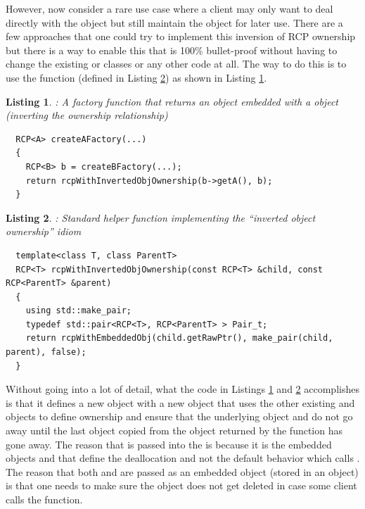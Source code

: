 \documentclass[pdf,ps2pdf,11pt]{SANDreport}
\newtheorem{listing}{Listing}
\begin{document}
However, now consider a rare use case where a client may only want to
deal directly with the {} object but still maintain the
{} object for later use.  There are a few approaches that
one could try to implement this inversion of RCP ownership but there
is a way to enable this that is 100\% bullet-proof without having to
change the existing {} or {} classes or any other
code at all.  The way to do this is to use the
{} function (defined in
Listing {}\ref{listing:rcpWithInvertedObjOwnership}) as shown in
Listing {}\ref{listing:A_owns_B_owns_A}.

\begin{listing}: A factory function that returns an {} object
embedded with a {} object (inverting the ownership relationship) \\
\label{listing:A_owns_B_owns_A}
{\small\begin{verbatim}
  RCP<A> createAFactory(...)
  {
    RCP<B> b = createBFactory(...);
    return rcpWithInvertedObjOwnership(b->getA(), b);
  }
\end{verbatim}}
\end{listing}


\begin{listing}: Standard helper function implementing the ``inverted
object ownership'' idiom \\
\label{listing:rcpWithInvertedObjOwnership}
{\small\begin{verbatim}
  template<class T, class ParentT>
  RCP<T> rcpWithInvertedObjOwnership(const RCP<T> &child, const RCP<ParentT> &parent)
  {
    using std::make_pair;
    typedef std::pair<RCP<T>, RCP<ParentT> > Pair_t;
    return rcpWithEmbeddedObj(child.getRawPtr(), make_pair(child, parent), false);
  }
\end{verbatim}}
\end{listing}




Without going into a lot of detail, what the code in Listings
{}\ref{listing:A_owns_B_owns_A} and
{}\ref{listing:rcpWithInvertedObjOwnership} accomplishes is that it
defines a new {} object with a new {} object
that uses the other existing {} and {} objects
to define ownership and ensure that the underlying {} object
and {} do not go away until the last {} object
copied from the object returned by the function
{} has gone away.  The reason that
{} is passed into the {} is
because it is the embedded objects {} and {}
that define the deallocation and not the default behavior which calls
{}.  The reason that both {} and
{} are passed as an embedded object (stored in an
{} object) is that one needs to make sure the {}
object does not get deleted in case some client calls the
{} function.
\end{document}
